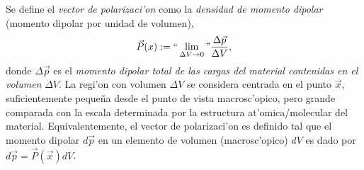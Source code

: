 Se define el \textit{vector de polarizaci'on} como la \textit{densidad de
momento dipolar} (momento dipolar por unidad de volumen),
\begin{equation}\label{defP}
\vec{P}(x):= ``\lim_{\Delta V\to 0}" \frac{\Delta\vec{p}}{\Delta V},
\end{equation}
donde $\Delta\vec{p}$ es el \textit{momento dipolar total de las cargas del material contenidas en el volumen} $\Delta V$. La regi'on con volumen $\Delta V$ se considera centrada en el punto $\vec{x}$, suficientemente peque\~na desde el punto de vista macrosc'opico, pero grande comparada con la escala  determinada por la estructura at'omica/molecular del material. Equivalentemente, el vector de polarizaci'on es definido tal que el momento dipolar $d\vec{p}$ en un elemento de volumen (macrosc'opico) $dV$ es dado por $d\vec{p}=\vec{P}(\vec{x})dV$.

